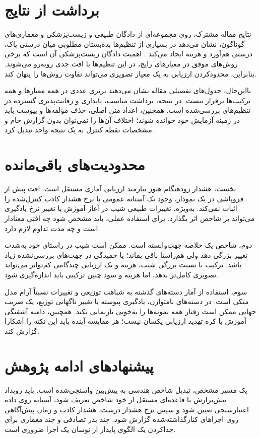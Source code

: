 \section{برداشت از نتایج}
نتایج مقاله مشترک، روی مجموعه‌ای از دادگان طبیعی و زیست‌پزشکی و معماری‌های گوناگون، نشان می‌دهد \sora{} در بسیاری از تنظیم‌ها بده‌بستان مطلوبی میان درستی پاک، درستی هم‌آورد و هزینه ایجاد می‌کند \cite{sora2026}. اهمیت دادگان زیست‌پزشکی آن است که برخی روش‌های موفق در معیارهای رایج، در این تنظیم‌ها با افت جدی روبه‌رو می‌شوند. بنابراین، محدودکردن ارزیابی به یک معیار تصویری می‌تواند تفاوت روش‌ها را پنهان کند.

بااین‌حال، جدول‌های تفصیلی مقاله نشان می‌دهند برتری عددی در همه معیارها و همه ترکیب‌ها برقرار نیست. در نتیجه، برداشت مناسب، پایداری و رقابت‌پذیری گسترده در تنظیم‌های بررسی‌شده است. همچنین، اعداد متن اصلی، حذف مؤلفه‌ها و پیوست باید در زمینه آزمایش خود خوانده شوند؛ اختلاف آن‌ها را نمی‌توان بدون گزارش خام و مشخصات نقطه کنترل به یک نتیجه واحد تبدیل کرد.

\section{محدودیت‌های باقی‌مانده}
نخست، هشدار زودهنگام هنوز نیازمند ارزیابی آماری مستقل است. افت پیش از فروپاشی در یک نمودار، وجود یک آستانه عمومی با نرخ هشدار کاذب کنترل‌شده را اثبات نمی‌کند. به‌ویژه، تغییرات طبیعی شیب در آغاز آموزش یا تغییر نرخ یادگیری می‌تواند بر شاخص اثر بگذارد. برای استفاده عملی، باید مشخص شود چه افتی معنادار است و چه مدت تداوم لازم دارد.

دوم، شاخص یک خلاصه جهت‌وابسته است. ممکن است شیب در راستای خود به‌شدت تغییر بزرگی دهد ولی هم‌راستا باقی بماند؛ یا خمیدگی در جهت‌های بررسی‌نشده زیاد باشد. ترکیب \pertalign{} با نسبت بزرگی شیب، هزینه و یک ارزیابی چندگامی کم‌تواتر می‌تواند تصویری کامل‌تر بدهد، اما هزینه و سود چنین ترکیبی باید اندازه‌گیری شود.

سوم، استفاده از آمار دسته‌های گذشته به شباهت توزیعی و تغییرات نسبتاً آرام مدل متکی است. در دسته‌های نامتوازن، یادگیری پیوسته یا تغییر ناگهانی توزیع، یک ضریب جهانی ممکن است رفتار همه نمونه‌ها را به‌خوبی بازنمایی نکند. همچنین، دامنه آشفتگی آموزش \sora{} با کره تهدید ارزیابی یکسان نیست؛ هر مقایسه آینده باید این نکته را آشکارا گزارش کند.

\section{پیشنهادهای ادامه پژوهش}
یک مسیر مشخص، تبدیل شاخص هندسی به پیش‌بین واسنجی‌شده است. باید رویداد بیش‌برازش با قاعده‌ای مستقل از خود شاخص تعریف شود، آستانه روی داده اعتبارسنجی تعیین شود و سپس نرخ هشدار درست، هشدار کاذب و زمان پیش‌آگاهی روی اجراهای کنارگذاشته‌شده گزارش شود. چند بذر تصادفی و چند معماری برای جداکردن یک الگوی پایدار از نوسان یک اجرا ضروری است.

